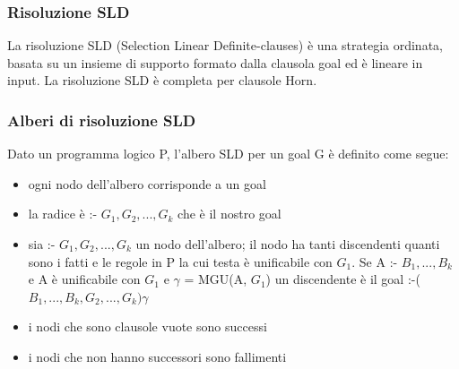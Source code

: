 \documentclass{article}
\begin{document}
\subsubsection{Risoluzione SLD}
La risoluzione SLD (Selection Linear Definite-clauses) è una strategia ordinata, basata su un insieme di supporto formato dalla clausola goal ed è lineare in input. La risoluzione SLD è completa per clausole Horn.

\subsubsection{Alberi di risoluzione SLD}
Dato un programma logico P, l’albero SLD per un goal G è definito come segue:
\begin{itemize}
    \item ogni nodo dell'albero corrisponde a un goal
    \item la radice è :- $G_1, G_2, ..., G_k$ che è il nostro goal
    \item sia :- $G_1, G_2, ..., G_k$ un nodo dell'albero; il nodo ha tanti discendenti quanti sono i fatti e le regole in P la cui testa è unificabile con $G_1$. \newline 
    Se A :- $B_1, ..., B_k$ e A è unificabile con $G_1$ e $\gamma$ = MGU(A, $G_1$) un discendente è il goal :-($B_1, ..., B_k, G_2, ..., G_k) \gamma$
    \item i nodi che sono clausole vuote sono successi
    \item i nodi che non hanno successori sono fallimenti
\end{itemize}
\end{document}
